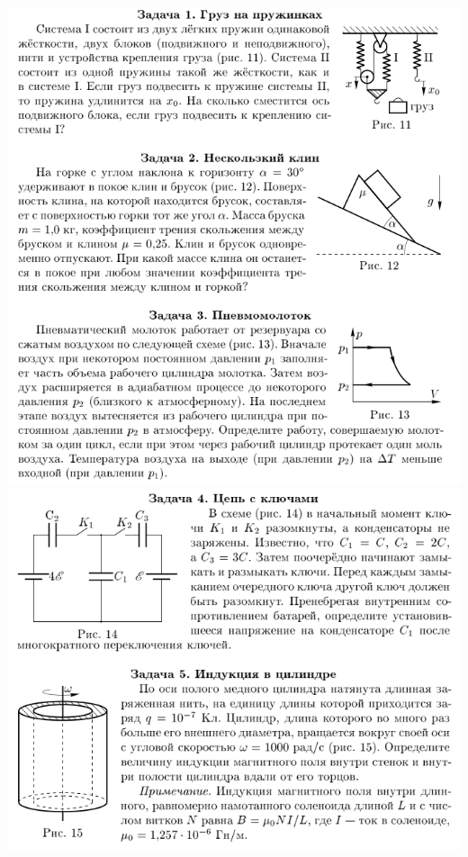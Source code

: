 




\begin{center}
  \includegraphics[width=14cm]{reg20081}
  \includegraphics[width=14cm]{reg20082}
\end{center}

